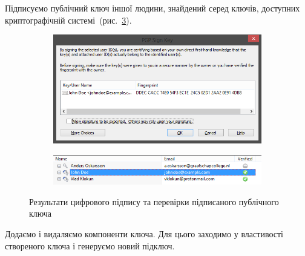 \documentclass[
	a4paper,
	oneside,
	BCOR = 10mm,
	DIV = 12,
	12pt,
	headings = normal,
]{scrartcl}
\newlength{\gridunitwidth}
\begin{document}
		Підписуємо публічний ключ іншої людини, знайдений серед ключів, доступних криптографічній системі~(рис.~\ref{fig:sign-verify-key}).

		\begin{figure}[!htbp]
			\centering
			\begin{subfigure}[b]{8 \gridunitwidth - 1em / (2-1)}
				\includegraphics[width = \columnwidth]{./assets/p18.png}
				\caption{}
				\label{subfig:sign-key}
			\end{subfigure}%
			\hspace{1em}%
			\begin{subfigure}[b]{8 \gridunitwidth - 1em / (2-1)}
				\includegraphics[width = \columnwidth]{./assets/p19.png}
				\caption{}
				\label{subfig:verify-key}
			\end{subfigure}
			\caption{Результати цифрового підпису та перевірки підписаного публічного ключа}
			\label{fig:sign-verify-key}
		\end{figure}

		Додаємо і видаляємо компоненти ключа. Для цього заходимо у властивості створеного ключа і генеруємо новий підключ.
\end{document}
